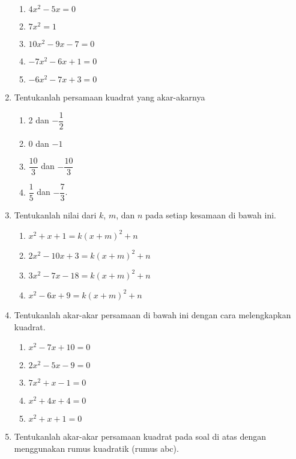 \begin{enumerate}[nosep]
\begin{multcols}
\begin{enumerate}
					\item $ 4x^{2} - 5x = 0 $
					\item $ 7x^{2} = 1 $
					\item $ 10x^{2} - 9x - 7 = 0 $
					\item $ -7x^{2} - 6x + 1 = 0 $
					\item $ -6x^{2} - 7x + 3 = 0 $
				\end{enumerate}
			\end{multcols}
			\item Tentukanlah persamaan kuadrat yang akar-akarnya
			\begin{multcols}
				\begin{enumerate}
					\item 2 dan $ -\dfrac{1}{2} $
					\item 0 dan $ -1 $
					\item $ \dfrac{10}{3} $ dan $ -\dfrac{10}{3} $
					\item $ \dfrac{1}{5} $ dan $ -\dfrac{7}{3} $.
				\end{enumerate}
			\end{multcols}
			\item Tentukanlah nilai dari $ k $, $ m $, dan $ n $ pada setiap kesamaan di bawah ini.
			\begin{enumerate}
				\item $ x^{2} + x + 1 = k\left(x + m\right)^{2} + n $
				\item $ 2x^{2} - 10x + 3 = k\left(x + m\right)^{2} + n $
				\item $ 3x^{2} - 7x - 18 = k\left(x + m\right)^{2} + n $
				\item $ x^{2} - 6x + 9 = k\left(x + m\right)^{2} + n $
			\end{enumerate}
			\item Tentukanlah akar-akar persamaan di bawah ini dengan cara melengkapkan kuadrat.
			\begin{multcols}
				\begin{enumerate}
					\item $ x^{2} - 7x + 10 = 0 $
					\item $ 2x^{2} - 5x - 9 = 0 $
					\item $ 7x^{2} + x - 1 = 0 $
					\item $ x^{2} + 4x + 4 = 0 $
					\item $ x^{2} + x + 1 = 0 $
				\end{enumerate}
			\end{multcols}
			\item Tentukanlah akar-akar persamaan kuadrat pada soal di atas dengan menggunakan rumus kuadratik (rumus abc).

\end{enumerate}
